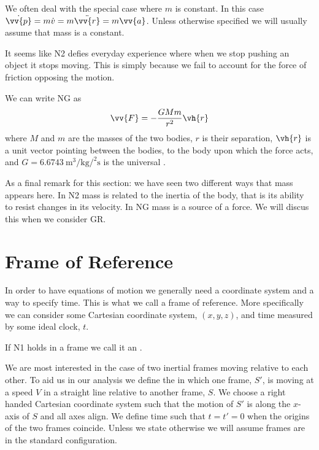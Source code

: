     We often deal with the special case where \(m\) is constant.
    In this case \(\dot{\vv{p}} = m\dot{v} = m\ddot{\vv{r}} = m\vv{a}\).
    Unless otherwise specified we will usually assume that mass is a constant.
    
    It seems like N2 defies everyday experience where when we stop pushing an object it stops moving.
    This is simply because we fail to account for the force of friction opposing the motion.
    
    We can write NG as
    \begin{equation}
        \vv{F} = -\frac{GMm}{r^2}\vh{r}
    \end{equation}
    where \(M\) and \(m\) are the masses of the two bodies, \(r\) is their separation, \(\vh{r}\) is a unit vector pointing between the bodies, to the body upon which the force acts, and \(G = \qty{6.6743}{\meter\cubed\per\kilogram\per\squared\second}\) is the universal .
    
    As a final remark for this section: we have seen two different ways that mass appears here.
    In N2 mass is related to the inertia of the body, that is its ability to resist changes in its velocity.
    In NG mass is a source of a force.
    We will discus this when we consider GR.
    
    \section{Frame of Reference}
    In order to have equations of motion we generally need a coordinate system and a way to specify time.
    This is what we call a frame of reference.
    More specifically we can consider some Cartesian coordinate system, \((x, y, z)\), and time measured by some ideal clock, \(t\).
    
    If N1 holds in a frame we call it an .
    
    We are most interested in the case of two inertial frames moving relative to each other.
    To aid us in our analysis we define the  in which one frame, \(S'\), is moving at a speed \(V\) in a straight line relative to another frame, \(S\).
    We choose a right handed Cartesian coordinate system such that the motion of \(S'\) is along the \(x\)-axis of \(S\) and all axes align.
    We define time such that \(t = t' = 0\) when the origins of the two frames coincide.
    Unless we state otherwise we will assume frames are in the standard configuration.
    

